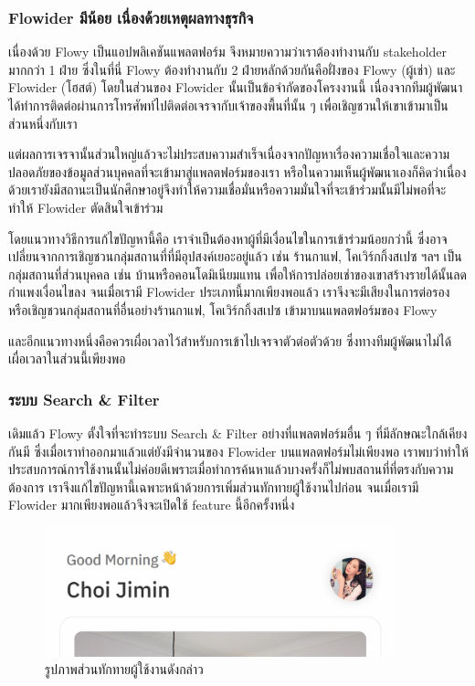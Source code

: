 \subsubsection{Flowider มีน้อย เนื่องด้วยเหตุผลทางธุรกิจ}
เนื่องด้วย Flowy เป็นแอปพลิเคชันแพลตฟอร์ม จึงหมายความว่าเราต้องทำงานกับ stakeholder มากกว่า 1 ฝ่าย ซึ่งในที่นี่ Flowy ต้องทำงานกับ 2 ฝ่ายหลักด้วยกันคือฝั่งของ Flowy (ผู้เช่า) และ Flowider (โฮสต์) โดยในส่วนของ Flowider นั้นเป็นข้อจำกัดของโครงงานนี้ เนื่องจากทีมผู้พัฒนาได้ทำการติดต่อผ่านการโทรศัพท์ไปติดต่อเจรจากับเจ้าของพื้นที่นั้น ๆ เพื่อเชิญชวนให้เขาเข้ามาเป็นส่วนหนึ่งกับเรา

แต่ผลการเจรจานั้นส่วนใหญ่แล้วจะไม่ประสบความสำเร็จเนื่องจากปัญหาเรื่องความเชื่อใจและความปลอดภัยของข้อมูลส่วนบุคคลที่จะเข้ามาสู่แพลตฟอร์มของเรา หรือในความเห็นผู้พัฒนาเองก็คิดว่าเนื่องด้วยเรายังมีสถานะเป็นนักศึกษาอยู่จึงทำให้ความเชื่อมั่นหรือความมั่นใจที่จะเข้าร่วมนั้นมีไม่พอที่จะทำให้ Flowider ตัดสินใจเข้าร่วม

โดยแนวทางวิธีการแก้ไขปัญหานี้คือ เราจำเป็นต้องหาผู้ที่มีเงื่อนไขในการเข้าร่วมน้อยกว่านี้ ซึ่งอาจเปลี่ยนจากการเชิญชวนกลุ่มสถานที่ที่มีอุปสงค์เยอะอยู่แล้ว เช่น ร้านกาแฟ, โคเวิร์กกิ้งสเปซ ฯลฯ เป็น กลุ่มสถานที่ส่วนบุคคล เช่น บ้านหรือคอนโดมิเนียมแทน เพื่อให้การปล่อยเช่าของเขาสร้างรายได้นั้นลดกำแพงเงื่อนไขลง จนเมื่อเรามี Flowider ประเภทนี้มากเพียงพอแล้ว เราจึงจะมีเสียงในการต่อรองหรือเชิญชวนกลุ่มสถานที่อื่นอย่างร้านกาแฟ, โคเวิร์กกิ้งสเปซ เข้ามาบนแพลตฟอร์มของ Flowy

และอีกแนวทางหนึ่งคือควรเผื่อเวลาไว้สำหรับการเข้าไปเจรจาตัวต่อตัวด้วย ซึ่งทางทีมผู้พัฒนาไม่ได้เผื่อเวลาในส่วนนี้เพียงพอ

\subsubsection{ระบบ Search \& Filter}
เดิมแล้ว Flowy ตั้งใจที่จะทำระบบ Search \& Filter อย่างที่แพลตฟอร์มอื่น ๆ ที่มีลักษณะใกล้เคียงกันมี ซึ่งเมื่อเราทำออกมาแล้วแต่ยังมีจำนวนของ Flowider บนแพลตฟอร์มไม่เพียงพอ เราพบว่าทำให้ประสบการณ์การใช้งานนั้นไม่ค่อยดีเพราะเมื่อทำการค้นหาแล้วบางครั้งก็ไม่พบสถานที่ที่ตรงกับความต้องการ เราจึงแก้ไขปัญหานี้เฉพาะหน้าด้วยการเพิ่มส่วนทักทายผู้ใช้งานไปก่อน จนเมื่อเรามี Flowider มากเพียงพอแล้วจึงจะเปิดใช้ feature นี้อีกครั้งหนึ่ง
\begin{figure}[h]
    \begin{center}
    \includegraphics[width=4in]{./image/welcome_bar.png}
    \end{center}
    \caption[Welcome bar]{รูปภาพส่วนทักทายผู้ใช้งานดังกล่าว}
    \label{fig:welcome_bar}
\end{figure}


